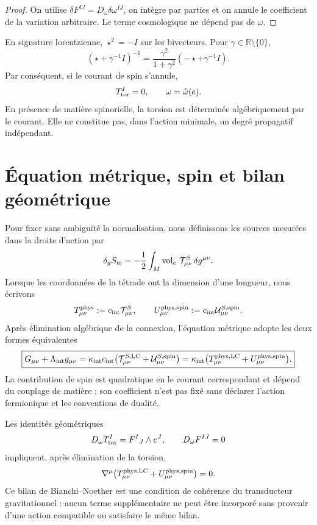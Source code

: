 \begin{proof}
On utilise \(\delta F^{IJ}=D_\omega\delta\omega^{IJ}\), on intègre par parties et
on annule le coefficient de la variation arbitraire. Le terme
cosmologique ne dépend pas de \(\omega\).
\end{proof}

En signature lorentzienne, \(\star^2=-I\) sur les bivecteurs. Pour
\(\gamma\in\mathbb R\setminus\{0\}\),
\[
 (\star+\gamma^{-1}I)^{-1}
 =\frac{\gamma^2}{1+\gamma^2}
  (-\star+\gamma^{-1}I).
\]
Par conséquent, si le courant de spin s'annule,
\[
 T_{\rm tor}^I=0,\qquad
 \omega=\mathring\omega(e).
\]
En présence de matière spinorielle, la torsion est déterminée algébriquement par le
courant. Elle ne constitue pas, dans l'action minimale, un degré propagatif
indépendant.

\section{Équation métrique, spin et bilan géométrique}

Pour fixer sans ambiguïté la normalisation, nous définissons les sources mesurées dans
la droite d'action par
\[
 \delta_g S_{\rm m}
 =-\frac12\int_M\operatorname{vol}_e\,
 \mathcal T^{S}_{\mu\nu}\,\delta g^{\mu\nu}.
\]
Lorsque les coordonnées de la tétrade ont la dimension d'une longueur, nous écrivons
\[
 T^{\rm phys}_{\mu\nu}:=c_{\rm int}\mathcal T^{S}_{\mu\nu},
 \qquad
 U^{\rm phys,spin}_{\mu\nu}
 :=c_{\rm int}\mathcal U^{S,\rm spin}_{\mu\nu}.
\]
Après élimination algébrique de la connexion, l'équation métrique adopte les
deux formes équivalentes
\[
 \boxed{
 G_{\mu\nu}+\Lambda_{\rm int}g_{\mu\nu}
 =\kappa_{\rm int}c_{\rm int}
 \bigl(\mathcal T_{\mu\nu}^{S,\rm LC}
       +\mathcal U_{\mu\nu}^{S,\rm spin}\bigr)
 =\kappa_{\rm int}
 \bigl(T_{\mu\nu}^{\rm phys,LC}
       +U_{\mu\nu}^{\rm phys,spin}\bigr).}
\]
La contribution de spin est quadratique en le courant correspondant et
dépend du couplage de matière ; son coefficient n'est pas fixé sans déclarer
l'action fermionique et les conventions de dualité.

Les identités géométriques
\[
 D_\omega T_{\rm tor}^{I}=F^{I}{}_{J}\wedge e^{J},
 \qquad
 D_\omega F^{IJ}=0
\]
impliquent, après élimination de la torsion,
\[
 \nabla^\mu\bigl(T_{\mu\nu}^{\rm phys,LC}
             +U_{\mu\nu}^{\rm phys,spin}\bigr)=0.
\]
Ce bilan de Bianchi--Noether est une condition de cohérence du
transducteur gravitationnel : aucun terme supplémentaire ne peut être incorporé sans
provenir d'une action compatible ou satisfaire le même bilan.

